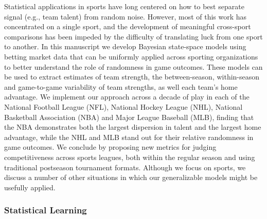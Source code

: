 \begin{itemize}
Statistical applications in sports have long centered on how to best separate signal (e.g., team talent) from random noise. However, most of this work has concentrated on a single sport, and the development of meaningful cross-sport comparisons has been impeded by the difficulty of translating luck from one sport to another. In this manuscript we develop Bayesian state-space models using betting market data that can be uniformly applied across sporting organizations to better understand the role of randomness in game outcomes. These models can be used to extract estimates of team strength, the between-season, within-season and game-to-game variability of team strengths, as well each team’s home advantage. We implement our approach across a decade of play in each of the National Football League (NFL), National Hockey League (NHL), National Basketball Association (NBA) and Major League Baseball (MLB), finding that the NBA demonstrates both the largest dispersion in talent and the largest home advantage, while the NHL and MLB stand out for their relative randomness in game outcomes. We conclude by proposing new metrics for judging competitiveness across sports leagues, both within the regular season and using traditional postseason tournament formats. Although we focus on sports, we discuss a number of other situations in which our generalizable models might be usefully applied.

\end{itemize}

\subsubsection*{Statistical Learning}

